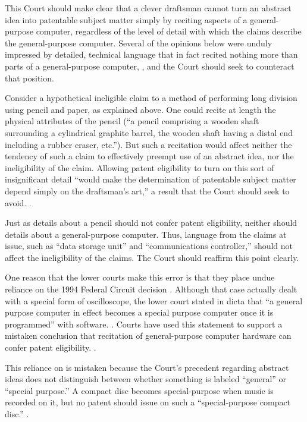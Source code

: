 \documentclass{scotus}
\begin{document}
This Court should make clear that a clever draftsman cannot turn an abstract
idea into patentable subject matter simply by reciting
aspects of a general-purpose computer, regardless of the level of detail with
which the claims describe the general-purpose computer. Several of the opinions
below were unduly impressed by detailed, technical language that in fact recited
nothing more than parts of a general-purpose computer, , and the Court should seek to counteract that position.

Consider a hypothetical ineligible claim to a method of performing long
division using pencil and paper, as explained above. One could
recite at length the physical attributes of the pencil (``a pencil
comprising a wooden shaft surrounding a cylindrical graphite barrel, the wooden
shaft having a distal end including a rubber eraser, etc.''). But such a
recitation would affect neither the tendency of such a claim to effectively
preempt use of an abstract idea, nor the ineligibility of the claim. Allowing
patent eligibility to turn on this sort of insignificant detail ``would make the
determination of patentable subject matter depend simply on the draftsman's
art,'' a result that the Court should seek to avoid. .

Just as details about a pencil should not confer patent
eligibility, neither should details about a general-purpose
computer.
Thus, language from the claims at issue, such as
``data storage unit'' and ``communications controller,'' should not affect the
ineligibility of the claims. The Court should reaffirm this point clearly.

One reason that the lower courts make this error is that they place undue
reliance on the 1994 Federal Circuit decision . Although that
case actually dealt with a special form of oscilloscope,
the lower court stated in dicta
that ``a general purpose computer in effect becomes a special purpose computer
once it is programmed'' with software. .
Courts have used this statement to support a mistaken conclusion that recitation
of general-purpose computer hardware can confer patent eligibility.
.

This reliance on  is mistaken because the
Court's precedent regarding abstract ideas does not
distinguish between whether something is labeled ``general'' or
``special purpose.'' A
compact disc becomes special-purpose when music is recorded on it, but no patent
should issue on such a ``special-purpose compact disc.'' .
\end{document}
